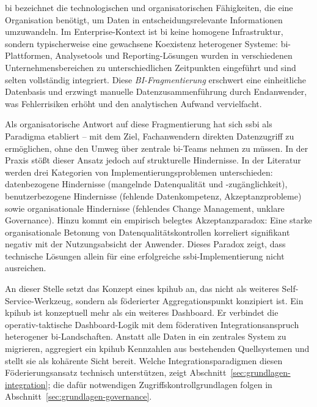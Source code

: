 \gls{bi} bezeichnet die technologischen und organisatorischen Fähigkeiten, die eine Organisation benötigt, um Daten in entscheidungsrelevante Informationen umzuwandeln.
Im Enterprise-Kontext ist \gls{bi} keine homogene Infrastruktur, sondern typischerweise eine gewachsene Koexistenz heterogener Systeme: \gls{bi}-Plattformen, Analysetools und Reporting-Lösungen wurden in verschiedenen Unternehmensbereichen zu unterschiedlichen Zeitpunkten eingeführt und sind selten vollständig integriert.
Diese \textit{BI-Fragmentierung} erschwert eine einheitliche Datenbasis und erzwingt manuelle Datenzusammenführung durch Endanwender, was Fehlerrisiken erhöht und den analytischen Aufwand vervielfacht.

Als organisatorische Antwort auf diese Fragmentierung hat sich \gls{ssbi} als Paradigma etabliert -- mit dem Ziel, Fachanwendern direkten Datenzugriff zu ermöglichen, ohne den Umweg über zentrale \gls{bi}-Teams nehmen zu müssen.
In der Praxis stößt dieser Ansatz jedoch auf strukturelle Hindernisse.
In der Literatur werden drei Kategorien von Implementierungsproblemen unterschieden: datenbezogene Hindernisse (mangelnde Datenqualität und -zugänglichkeit), benutzerbezogene Hindernisse (fehlende Datenkompetenz, Akzeptanzprobleme) sowie organisationale Hindernisse (fehlendes Change Management, unklare Governance).
Hinzu kommt ein empirisch belegtes Akzeptanzparadox: Eine starke organisationale Betonung von Datenqualitätskontrollen korreliert signifikant negativ mit der Nutzungsabsicht der Anwender.
Dieses Paradox zeigt, dass technische Lösungen allein für eine erfolgreiche \gls{ssbi}-Imple\-men\-tie\-rung nicht ausreichen.

An dieser Stelle setzt das Konzept eines \gls{kpihub} an, das nicht als weiteres Self-Service-Werkzeug, sondern als föderierter Aggregationspunkt konzipiert ist.
Ein \gls{kpihub} ist konzeptuell mehr als ein weiteres Dashboard.
Er verbindet die operativ-taktische Dashboard-Logik mit dem föderativen Integrationsanspruch heterogener \gls{bi}-Landschaften. Anstatt alle Daten in ein zentrales System zu migrieren, aggregiert ein \gls{kpihub} Kennzahlen aus bestehenden Quellsystemen und stellt sie als kohärente Sicht bereit.
Welche Integrationsparadigmen diesen Föderierungsansatz technisch unterstützen, zeigt Abschnitt~\ref{sec:grundlagen-integration}; die dafür notwendigen Zugriffskontrollgrundlagen folgen in Abschnitt~\ref{sec:grundlagen-governance}.

